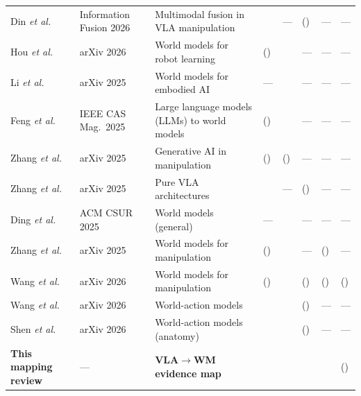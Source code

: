 \documentclass{ieeeaccess}
\newcommand{\cmark}{\ding{51}}
\begin{document}
\begin{table}[!t]
\begin{tabular}{p{2.7cm}p{2.1cm}p{4.3cm}p{0.8cm}p{0.8cm}p{0.8cm}p{0.8cm}p{0.8cm}}
Din \emph{et al.}~\cite{din2025priorvlasurvey} & Information Fusion 2026 & Multimodal fusion in VLA manipulation & \cmark & --- & (\cmark) & --- & --- \\
Hou \emph{et al.}~\cite{hou2026wm} & arXiv 2026 & World models for robot learning & (\cmark) & \cmark & --- & --- & --- \\
Li \emph{et al.}~\cite{li2025wm} & arXiv 2025 & World models for embodied AI & --- & \cmark & --- & --- & --- \\
Feng \emph{et al.}~\cite{feng2025} & IEEE CAS Mag.\ 2025 & Large language models (LLMs) to world models & (\cmark) & \cmark & --- & --- & --- \\
Zhang \emph{et al.}~\cite{zhang2025generative} & arXiv 2025 & Generative AI in manipulation & (\cmark) & (\cmark) & --- & --- & --- \\
Zhang \emph{et al.}~\cite{zhang2025pure} & arXiv 2025 & Pure VLA architectures & \cmark & --- & (\cmark) & --- & --- \\
Ding \emph{et al.}~\cite{ding2025worldsurvey} & ACM CSUR 2025 & World models (general) & --- & \cmark & --- & --- & --- \\
\textcolor[RGB]{104,48,148}{Zhang \emph{et al.}}~\cite{li2025step} & arXiv 2025 & World models for manipulation & (\cmark) & \cmark & --- & (\cmark) & --- \\
Wang \emph{et al.}~\cite{wang2026manipwmsurvey} & arXiv 2026 & World models for manipulation & (\cmark) & \cmark & (\cmark) & (\cmark) & (\cmark) \\
Wang \emph{et al.}~\cite{wamfrontier} & arXiv 2026 & World-action models & \cmark & \cmark & (\cmark) & --- & --- \\
Shen \emph{et al.}~\cite{wamsurvey} & arXiv 2026 & World-action models (anatomy) & \cmark & \cmark & (\cmark) & --- & --- \\
\midrule
\textbf{This mapping review} & --- & \textbf{VLA$\to$WM evidence map} & \cmark & \cmark & \cmark & \cmark & (\cmark) \\
\bottomrule
\end{tabular}
\end{table}
\end{document}
